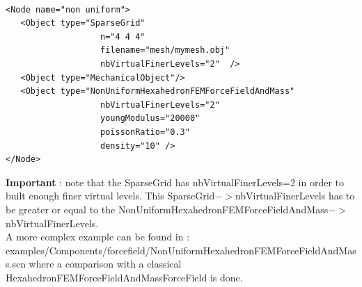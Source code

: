 \begin{verbatim}

<Node name="non uniform">
   <Object type="SparseGrid"
                   n="4 4 4"
                   filename="mesh/mymesh.obj"
                   nbVirtualFinerLevels="2"  />
   <Object type="MechanicalObject"/>
   <Object type="NonUniformHexahedronFEMForceFieldAndMass"
                   nbVirtualFinerLevels="2"
                   youngModulus="20000"
                   poissonRatio="0.3"
                   density="10" />
</Node>

\end{verbatim}

\textbf{Important} : note that the SparseGrid has nbVirtualFinerLevels=2 in order to built enough finer virtual levels. This SparseGrid$->$nbVirtualFinerLevels has to be greater or equal to the NonUniformHexahedronFEMForceFieldAndMass$->$nbVirtualFinerLevels.
\\

A more complex example can be found in : examples/Components/forcefield/NonUniformHexahedronFEMForceFieldAndMass.scn where a comparison with a classical HexahedronFEMForceFieldAndMassForceField is done.

